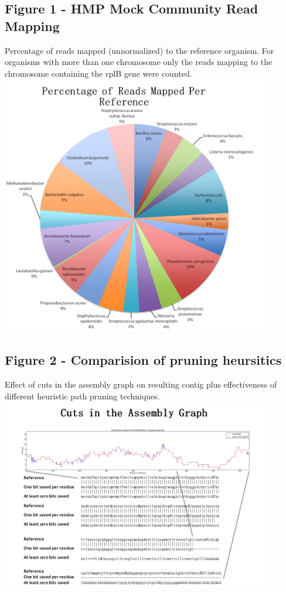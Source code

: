 \documentclass[10pt]{bmc_article}
\newenvironment{bmcformat}{\begin{raggedright}\baselineskip20pt\sloppy\setboolean{publ}{false}}{\end{raggedright}\baselineskip20pt\sloppy}
\begin{document}
\begin{bmcformat}
\subsection*{Figure 1 - HMP Mock Community Read Mapping}
  \label{fig:bowtie_mapping}
  Percentage of reads mapped (unnormalized) to the reference organism.  For organisms with more than one chromosome only the reads mapping to the chromosome containing the rplB gene were counted.
  \includegraphics[width=117mm]{hmp_mock_community_mapping_chart.png}
\subsection*{Figure 2 - Comparision of pruning heursitics}
  \label{fig:comp_pruning_techniques}
  Effect of cuts in the assembly graph on resulting contig plus effectiveness of different heuristic path pruning techniques.
  \includegraphics[width=117mm]{pruning_heuristics.png}

\end{bmcformat}
\end{document}
